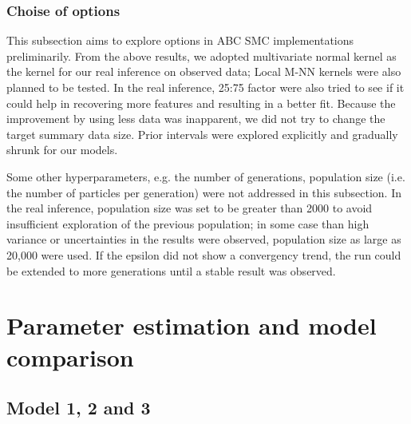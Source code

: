 

\subsubsection{Choise of options} 

This subsection aims to explore options in ABC SMC implementations preliminarily. From the above results, we adopted multivariate normal kernel as the kernel for our real inference on observed data; Local M-NN kernels were also planned to be tested. In the real inference, 25:75 factor were also tried to see if it could help in recovering more features and resulting in a better fit. Because the improvement by using less data was inapparent, we did not try to change the target summary data size. Prior intervals were explored explicitly and gradually shrunk for our models.

Some other hyperparameters, e.g. the number of generations, population size (i.e. the number of particles per generation) were not addressed in this subsection. In the real inference, population size was set to be greater than 2000 to avoid insufficient exploration of the previous population; in some case than high variance or uncertainties in the results were observed, population size as large as 20,000 were used. If the epsilon did not show a convergency trend, the run could be extended to more generations until a stable result was observed.









\section{Parameter estimation and model comparison}

\subsection{Model 1, 2 and 3}


